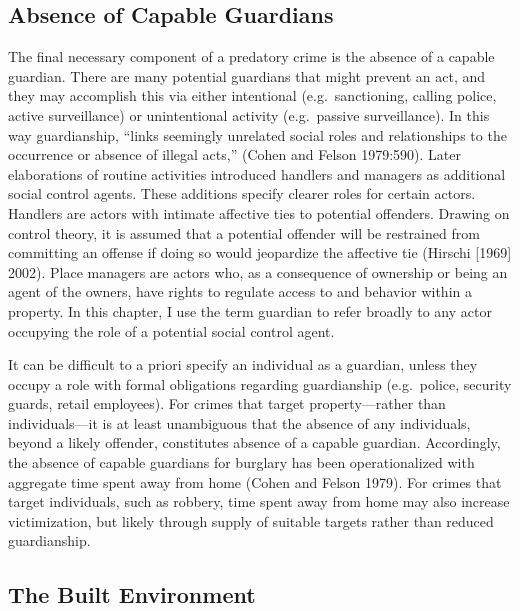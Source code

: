 \documentclass [11pt, proquest] {uwthesis}[2015/03/03]
\begin{document}
\hypertarget{absence-of-capable-guardians}{%
\subsection{Absence of Capable Guardians}\label{absence-of-capable-guardians}}

The final necessary component of a predatory crime is the absence of a capable guardian. There are many potential guardians that might prevent an act, and they may accomplish this via either intentional (e.g.~sanctioning, calling police, active surveillance) or unintentional activity (e.g.~passive surveillance). In this way guardianship, ``links seemingly unrelated social roles and relationships to the occurrence or absence of illegal acts,'' (Cohen and Felson 1979:590). Later elaborations of routine activities introduced handlers and managers as additional social control agents. These additions specify clearer roles for certain actors. Handlers are actors with intimate affective ties to potential offenders. Drawing on control theory, it is assumed that a potential offender will be restrained from committing an offense if doing so would jeopardize the affective tie (Hirschi {[}1969{]} 2002). Place managers are actors who, as a consequence of ownership or being an agent of the owners, have rights to regulate access to and behavior within a property. In this chapter, I use the term guardian to refer broadly to any actor occupying the role of a potential social control agent.

It can be difficult to a priori specify an individual as a guardian, unless they occupy a role with formal obligations regarding guardianship (e.g.~police, security guards, retail employees). For crimes that target property---rather than individuals---it is at least unambiguous that the absence of any individuals, beyond a likely offender, constitutes absence of a capable guardian. Accordingly, the absence of capable guardians for burglary has been operationalized with aggregate time spent away from home (Cohen and Felson 1979). For crimes that target individuals, such as robbery, time spent away from home may also increase victimization, but likely through supply of suitable targets rather than reduced guardianship.

\hypertarget{the-built-environment}{%
\subsection{The Built Environment}\label{the-built-environment}}
\end{document}
